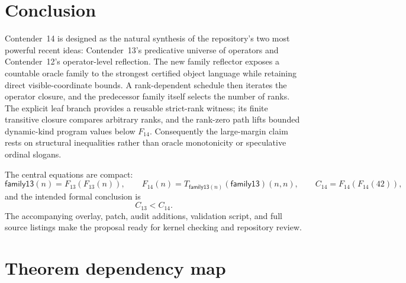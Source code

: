 \documentclass[11pt]{article}
\theoremstyle{definition}
\theoremstyle{remark}
\newcommand{\C}[1]{C_{#1}}
\begin{document}
\section{Conclusion}

Contender~14 is designed as the natural synthesis of the repository's two most
powerful recent ideas: Contender~13's predicative universe of operators and
Contender~12's operator-level reflection.  The new family reflector exposes a
countable oracle family to the strongest certified object language while
retaining direct visible-coordinate bounds.  A rank-dependent schedule then
iterates the operator closure, and the predecessor family itself selects the
number of ranks.  The explicit leaf branch provides a reusable strict-rank
witness; its finite transitive closure compares arbitrary ranks, and the
rank-zero path lifts bounded dynamic-kind program values below $F_{14}$.
Consequently the large-margin claim rests on structural inequalities rather
than oracle monotonicity or speculative ordinal slogans.

The central equations are compact:
\[
\mathsf{family13}(n)=F_{13}(F_{13}(n)),\qquad
F_{14}(n)=T_{\mathsf{family13}(n)}(\mathsf{family13})(n,n),\qquad
\C{14}=F_{14}(F_{14}(42)),
\]
and the intended formal conclusion is
\[
\boxed{\C{13}<\C{14}}.
\]
The accompanying overlay, patch, audit additions, validation script, and full
source listings make the proposal ready for kernel checking and repository
review.

\appendix

\section{Theorem dependency map}
\end{document}
